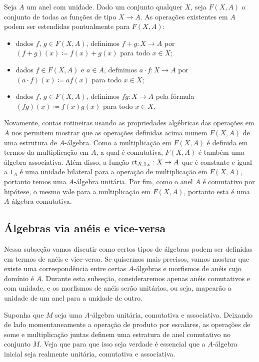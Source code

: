 \begin{exem}
  Seja $A$ um anel com unidade.
  Dado um conjunto qualquer $X$, seja $F(X,A)$ o conjunto de todas as funções de tipo $X \to A$.
  As operações existentes em $A$ podem ser estendidas pontualmente para $F(X,A)$:
  \begin{itemize}
  \item dados $f,\, g \in F(X,A)$, definimos $f+g: X \to A$ por $(f+g)(x) \coloneqq f(x) + g(x)$ para todo $x \in X$;
    
  \item dados $f \in F(X,A)$ e $a \in A$, definimos $a \cdot f: X \to A$ por $(a \cdot f)(x) \coloneqq af(x)$ para todo $x \in X$;
    
  \item dados $f,\, g \in F(X,A)$, definimos $fg: X \to A$ pela fórmula $(fg)(x) \coloneqq f(x)g(x)$ para todo $x \in X$.
  \end{itemize}

  Novamente, contas rotineiras usando as propriedades algébricas das operações em $A$ nos permitem mostrar que as operações definidas acima munem $F(X,A)$ de uma estrutura de $A$-álgebra.
  Como a multiplicação em $F(X,A)$ é definida em termos da multiplicação em $A$, a qual é comutativa, $F(X,A)$ é também uma álgebra associativa.
  Além disso, a função $\mathrm{ct}_{X,1_A}: X \to A$ que é constante e igual a $1_A$ é uma unidade bilateral para a operação de multiplicação em $F(X,A)$, portanto temos uma $A$-álgebra unitária.
  Por fim, como o anel $A$ é comutativo por hipótese, o mesmo vale para a multiplicação em $F(X,A)$, portanto esta é uma $A$-álgebra comutativa.
\end{exem}

\subsection{Álgebras via anéis e vice-versa}

Nessa subseção vamos discutir como certos tipos de álgebras podem ser definidas em termos de anéis e vice-versa.
Se quisermos mais precisos, vamos mostrar que existe uma correspondência entre certas $A$-álgebras e morfismos de anéis cujo domínio é $A$.
Durante esta subseção, consideraremos apenas anéis comutativos e com unidade, e os morfismos de anéis  serão unitários, ou seja, mapearão a unidade de um anel para a unidade de outro.

Suponha que $M$ seja uma $A$-álgebra unitária, comutativa e associativa.
Deixando de lado momentaneamente a operação de produto por escalares, as operações de some e multiplicação juntas definem uma estratura de anel comutativo no conjunto $M$.
Veja que para que isso seja verdade é essencial que a $A$-álgebra inicial seja realmente unitária, comutativa e associativa.

